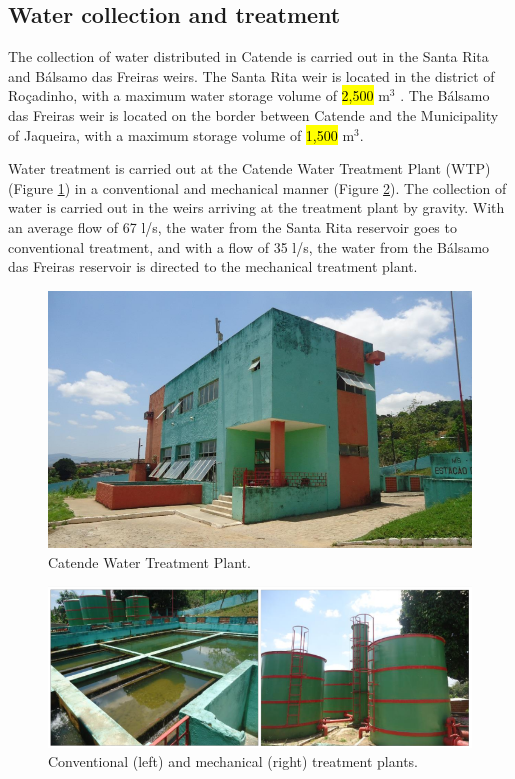 \documentclass{singlecol}
\theoremstyle{TH}{
\newtheorem{lemma}{Lemma}
\newtheorem{theorem}[lemma]{Theorem}
\newtheorem{corrolary}[lemma]{Corrolary}
\newtheorem{conjecture}[lemma]{Conjecture}
\newtheorem{proposition}[lemma]{Proposition}
\newtheorem{claim}[lemma]{Claim}
\newtheorem{stheorem}[lemma]{Wrong Theorem}
\newtheorem{algorithm}{Algorithm}
}
\theoremstyle{THrm}{
\newtheorem{definition}{Definition}[section]
\newtheorem{question}{Question}[section]
\newtheorem{remark}{Remark}
\newtheorem{scheme}{Scheme}
}
\theoremstyle{THhit}{
\newtheorem{case}{Case}[section]
}
\begin{document}
\subsection{Water collection and treatment}

The collection of water distributed in Catende is carried out in the Santa Rita and Bálsamo das Freiras weirs. The Santa Rita weir is located in the district of Roçadinho, with a maximum water storage volume of \hl{2,500} m$^3$ . The Bálsamo das Freiras weir is located on the border between Catende and the Municipality of Jaqueira, with a maximum storage volume of \hl{1,500} m$^3$.

Water treatment is carried out at the Catende Water Treatment Plant (WTP) (Figure \ref{fig:WTP}) in a conventional and mechanical manner (Figure \ref{fig:WTPConvMec}). The collection of water is carried out in the weirs arriving at the treatment plant by gravity. With an average flow of 67 l/s, the water from the Santa Rita reservoir goes to conventional treatment, and with a flow of 35 l/s, the water from the Bálsamo das Freiras reservoir is directed to the mechanical treatment plant. 

\begin{figure}[h]
\caption{Catende Water Treatment Plant.}
\label{fig:WTP}
\centering
\includegraphics[width=\textwidth]{figures/ETACatende.png}
\end{figure}


\begin{figure}[h]
\caption{Conventional (left) and mechanical (right) treatment plants.}
\label{fig:WTPConvMec}
\centering
\includegraphics[width=\textwidth]{figures/ETAConvMec.png}
\end{figure}
\end{document}
